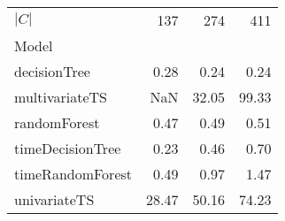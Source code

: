 \begin{tabular}{lrrr}
\toprule
$|C|$ & 137 & 274 & 411 \\
Model &  &  &  \\
\midrule
decisionTree & 0.28 & 0.24 & 0.24 \\
multivariateTS & NaN & 32.05 & 99.33 \\
randomForest & 0.47 & 0.49 & 0.51 \\
timeDecisionTree & 0.23 & 0.46 & 0.70 \\
timeRandomForest & 0.49 & 0.97 & 1.47 \\
univariateTS & 28.47 & 50.16 & 74.23 \\
\bottomrule
\end{tabular}
